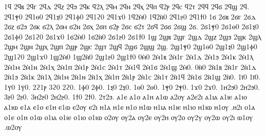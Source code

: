 {%
1ϥ 2ϥⲃ 2ϥⲅ 2ϥⲇ 2ϥⲍ 2ϥϧ 2ϥⲕ ϥ2ⲗ 2ϥⲙ 2ϥⲛ 2ϥⲭ 2ϥⲡ ϥ2ⲣ 2ϥⲥ ϥ2ⲧ 2ϥϥ 2ϥϭ 2ϥϣ 2ϥ. 2ϥ1ⲯ0 2ϥ1ⲑ0 2ϥ1ⲝ0 2ϥ1ⲫ0 2ϥ1ϩ0 2ϥ1ϫ0 1ϥ2ⲙ̀0 1ϥ2ⲛ̀0 2ϥ1ⳉ0 2ϥ1ϯ0
%
1ϭ 2ϭⲃ 2ϭⲅ 2ϭⲇ 2ϭⲍ ϭ2ϧ 2ϭⲕ ϭ2ⲗ 2ϭⲙ ϭ2ⲛ 2ϭⲭ 2ϭⲡ ϭ2ⲣ 2ϭⲥ ϭ2ⲧ 2ϭϥ 2ϭϭ 2ϭϣ 2ϭ. 2ϭ1ⲯ0 2ϭ1ⲑ0 2ϭ1ⲝ0 2ϭ1ⲫ0 2ϭ1ϩ0 2ϭ1ϫ0 1ϭ2ⲙ̀0 1ϭ2ⲛ̀0 2ϭ1ⳉ0 2ϭ1ϯ0
%
1ϣ 2ϣⲃ 2ϣⲅ 2ϣⲇ 2ϣⲍ 2ϣϧ 2ϣⲕ 2ϣⲗ 2ϣⲙ 2ϣⲛ 2ϣⲭ 2ϣⲡ 2ϣⲣ 2ϣⲥ 2ϣⲧ 2ϣϥ 2ϣϭ 2ϣϣ 2ϣ. 2ϣ1ⲯ0 2ϣ1ⲑ0 2ϣ1ⲝ0 2ϣ1ⲫ0 2ϣ1ϩ0 2ϣ1ϫ0 1ϣ2ⲙ̀0 1ϣ2ⲛ̀0 2ϣ1ⳉ0 2ϣ1ϯ0
%
0ⲙ̀0 2ⲙ̀1ⲃ 2ⲙ̀1ⲅ 2ⲙ̀1ⲇ 2ⲙ̀1ϧ 2ⲙ̀1ⲕ 2ⲙ̀1ⲗ 2ⲙ̀1ⲙ 2ⲙ̀1ⲛ 2ⲙ̀1ⲭ 2ⲙ̀1ⲡ 2ⲙ̀1ⲣ 2ⲙ̀1ⲥ 2ⲙ̀1ⲧ 2ⲙ̀1ϥ 2ⲙ̀1ϭ 2ⲙ̀1ϣ 2ⲙ̀0. %
%
0ⲛ̀0 2ⲛ̀1ⲃ 2ⲛ̀1ⲅ 2ⲛ̀1ⲇ 2ⲛ̀1ϧ 2ⲛ̀1ⲕ 2ⲛ̀1ⲗ 2ⲛ̀1ⲙ 2ⲛ̀1ⲛ 2ⲛ̀1ⲭ 2ⲛ̀1ⲡ 2ⲛ̀1ⲣ 2ⲛ̀1ⲥ 2ⲛ̀1ⲧ 2ⲛ̀1ϥ 2ⲛ̀1ϭ 2ⲛ̀1ϣ 2ⲛ̀0. %
%
1ⲓ̈0 1ⲓ̈0. %
1ⲩ̈0 1ⲩ̈0. %
2ϩ1ⲣ 3ϩ0 2ϩ0.    %
1ⲫ0 2ⲫ0.   %
1ⲝ0 2ⲝ0.   %
1ⲑ0 2ⲑ0.   %
1ⲯ0 2ⲯ0.   %
1ϫ0 2ϫ0.   %
1ⲏ2ϧ0 2ⲏ2ϧ0. %
3ⳉ0 2ⳉ0. 3ⲏ2ⳉ0 2ⲏ2ⳉ0. %
1ϯ0 2ϯ0. 2ⲧ2ϧ. %
%
 ⲁ1ⲉ ⲁ1ⲟ ⲁ1ⲏ ⲁ1ⲱ ⲁ2ⲟⲩ ⲁ2ⲉ2ⲓ ⲁ1ⲓⲁ ⲁ1ⲓⲉ ⲁ1ⲓⲟ ⲁ1ⲓⲱ
 ⲉ1ⲁ ⲉ1ⲟ ⲉ1ⲏ ⲉ1ⲱ ⲉ2ⲟⲩ ⲉ2ⲓ
 ⲏ1ⲁ ⲏ1ⲉ ⲏ1ⲟ ⲏ1ⲱ ⲏ1ⲓⲁ ⲏ1ⲓⲉ ⲏ1ⲓⲟ ⲏ1ⲓⲱ ⲏ1ⲟⲩ .ⲏ2ⲓ
 ⲟ1ⲁ ⲟ1ⲉ ⲟ1ⲏ ⲟ1ⲱ ⲟ1ⲓⲁ ⲟ1ⲓⲉ ⲟ1ⲓⲟ ⲟ1ⲓⲱ ⲟ2ⲟⲩ
 ⲟⲩ2ⲁ ⲟⲩ2ⲉ ⲟⲩ2ⲏ ⲟⲩ2ⲟ ⲟⲩ2ⲩ ⲟⲩ2ⲱ ⲟⲩ2ⲓ
 ⲱ1ⲟⲩ .ⲱ2ⲟⲩ
}
